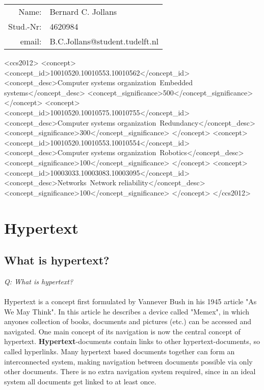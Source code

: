 \documentclass{sig-alternate-05-2015}
\begin{document}
\begin{tabular}{rl}
Name: & Bernard C. Jollans\\Stud.-Nr: & 4620984\\email: & B.C.Jollans@student.tudelft.nl
\end{tabular}

\begin{CCSXML}
<ccs2012>
 <concept>
  <concept_id>10010520.10010553.10010562</concept_id>
  <concept_desc>Computer systems organization~Embedded systems</concept_desc>
  <concept_significance>500</concept_significance>
 </concept>
 <concept>
  <concept_id>10010520.10010575.10010755</concept_id>
  <concept_desc>Computer systems organization~Redundancy</concept_desc>
  <concept_significance>300</concept_significance>
 </concept>
 <concept>
  <concept_id>10010520.10010553.10010554</concept_id>
  <concept_desc>Computer systems organization~Robotics</concept_desc>
  <concept_significance>100</concept_significance>
 </concept>
 <concept>
  <concept_id>10003033.10003083.10003095</concept_id>
  <concept_desc>Networks~Network reliability</concept_desc>
  <concept_significance>100</concept_significance>
 </concept>
</ccs2012>  
\end{CCSXML}
\section{Hypertext}
\subsection{What is hypertext?}
{\it Q: What is hypertext?}\\\\
Hypertext is a concept first formulated by Vannever Bush in his 1945 article
"As We May Think"\cite{vBush}. In this article he describes a device called "Memex", in which
anyones collection of books, documents and pictures (etc.) can be accessed and navigated.\cite{vBush}
One main concept of its navigation is now the central concept of hypertext.
{\bf Hypertext}-documents contain links to other hypertext-documents, so called hyperlinks.
Many hypertext based documents together can form an interconnected system, making navigation
between documents possible via only other documents. There is no extra navigation system required,
since in an ideal system all documents get linked to at least once.
\end{document}
